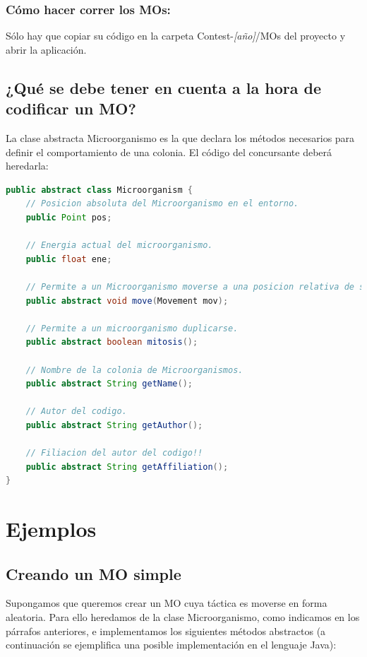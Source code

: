 \documentclass[11pt,a4paper]{article}
\begin{document}
\subsubsection{Cómo hacer correr los MOs:}
Sólo hay que copiar su código en la carpeta Contest-{\it [año]}/MOs del proyecto y abrir la aplicación.

\subsection{¿Qué se debe tener en cuenta a la hora de codificar un MO?}
La clase abstracta Microorganismo es la que declara los métodos necesarios para definir el comportamiento de una colonia.
El código del concursante deberá heredarla:

\begin{lstlisting}[style=Code, language=Java]
public abstract class Microorganism {
	// Posicion absoluta del Microorganismo en el entorno.
	public Point pos;

	// Energia actual del microorganismo.
	public float ene;

	// Permite a un Microorganismo moverse a una posicion relativa de su posicion actual (pos).
	public abstract void move(Movement mov);

	// Permite a un microorganismo duplicarse.
	public abstract boolean mitosis();

	// Nombre de la colonia de Microorganismos.
	public abstract String getName();

	// Autor del codigo.
	public abstract String getAuthor();

	// Filiacion del autor del codigo!!
	public abstract String getAffiliation();
}
\end{lstlisting}

\section{Ejemplos}
\subsection{Creando un MO simple}
Supongamos que queremos crear un MO cuya táctica es moverse en forma aleatoria.
Para ello heredamos de la clase Microorganismo, como indicamos en los párrafos anteriores, e implementamos los siguientes métodos abstractos (a continuación se ejemplifica una posible implementación en el lenguaje Java):
\end{document}
